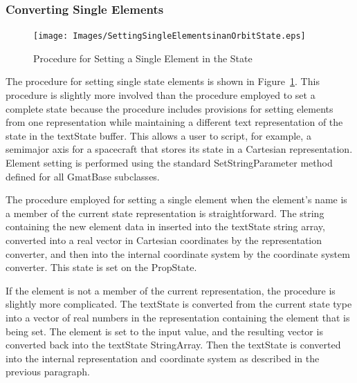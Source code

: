 \subsubsection{Converting Single Elements}

\begin{figure}[htb]
\begin{center}
\texttt{[image: Images/SettingSingleElementsinanOrbitState.eps]}
\caption{\label{figure:StateElementConversion}Procedure for Setting a Single Element in the State}
\end{center}
\end{figure}

The procedure for setting single state elements is shown in
Figure~\ref{figure:StateElementConversion}.  This procedure is slightly more involved than the
procedure employed to set a complete state because the procedure includes provisions for setting
elements from one representation while maintaining a different text representation of the state in
the textState buffer.  This allows a user to script, for example, a semimajor axis for a spacecraft
that stores its state in a Cartesian representation.  Element setting is performed using the
standard SetStringParameter method defined for all GmatBase subclasses.

The procedure employed for setting a single element when the element's name is a member of the
current state representation is straightforward.  The string containing the new element data in
inserted into the textState string array, converted into a real vector in Cartesian coordinates by
the representation converter, and then into the internal coordinate system by the coordinate system
converter.  This state is set on the PropState.

If the element is not a member of the current representation, the procedure is slightly more
complicated. The textState is converted from the current state type into a vector of real numbers
in the representation containing the element that is being set.  The element is set to the input
value, and the resulting vector is converted back into the textState StringArray.  Then the
textState is converted into the internal representation and coordinate system as described in the
previous paragraph.

